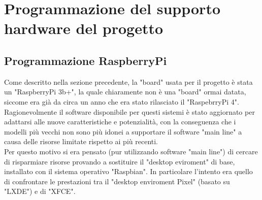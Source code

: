 \chapter{Programmazione del supporto hardware del progetto}\label{cap:Programmazione del supporto hardware del progetto}

\section{Programmazione RaspberryPi}\label{sez:Programmazione RaspberryPi}

Come descritto nella sezione precedente, la "board" usata per il progetto è stata un "RaspberryPi 3b+", la quale chiaramente non è una "board" ormai datata, siccome era già da circa un anno che era stato rilasciato il "RaspebrryPi 4". Ragionevolmente il software disponibile per questi sistemi è stato aggiornato per adattarsi alle nuove caratteristiche e potenzialità, con la conseguenza che i modelli più vecchi non sono più idonei a supportare il software "main line" a causa delle risorse limitate rispetto ai più recenti.\\
Per questo motivo si era pensato (pur utilizzando software "main line") di cercare di risparmiare risorse provando a sostituire il "desktop eviroment" di base, installato con il sistema operativo "Raspbian". In particolare l'intento era quello di confrontare le prestazioni tra il "desktop enviroment Pixel" (basato su "LXDE") e di "XFCE".  

